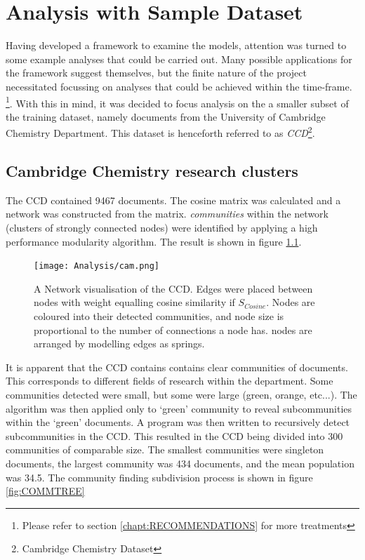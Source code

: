 \chapter{Analysis with Sample Dataset}
Having developed a framework to examine the models, attention was turned to some example analyses that could be carried out. Many possible applications for the framework suggest themselves, but the finite nature of the project necessitated focussing on analyses that could be achieved within the time-frame. \footnote{Please refer to section \ref{chapt:RECOMMENDATIONS} for more treatments}. With this in mind, it was decided to focus analysis on the a smaller subset of the training dataset, namely documents from the University of Cambridge Chemistry Department. This dataset is henceforth referred to as \emph{CCD}\footnote{Cambridge Chemistry Dataset}.
\section{Cambridge Chemistry research clusters}
\label{sec:RESEARCHCLUSTERS}
The CCD contained 9467 documents. The cosine matrix was calculated and a network was constructed from the matrix. \emph{communities} within the network (clusters of strongly connected nodes) were identified by applying a high performance modularity algorithm\cite{modularity1}\cite{modularity2}. The result is shown in figure \ref{fig:CAMCOMMUNITIES}.
\begin{center}
\begin{figure}[H]
\label{fig:CAMCOMMUNITIES}
  \centering
    \texttt{[image: Analysis/cam.png]}
    \caption{A Network visualisation of the CCD. Edges were placed between nodes with weight equalling cosine similarity if $S_{Cosine}$. Nodes are coloured into their detected communities, and node size is proportional to the number of connections a node has. nodes are arranged by modelling edges as springs.}
\end{figure} 
\end{center}
It is apparent that the CCD contains contains clear communities of documents. This corresponds to different fields of research within the department. Some communities detected were small, but some were large (green, orange, etc...). The algorithm was then applied only to `green' community to reveal subcommunities within the `green' documents. A program was then written to recursively detect subcommunities in the CCD. This resulted in the CCD being divided into 300 communities of comparable size. The smallest communities were singleton documents, the largest community was 434 documents, and the mean population was 34.5. The community finding subdivision process is shown in figure \ref{fig:COMMTREE}
